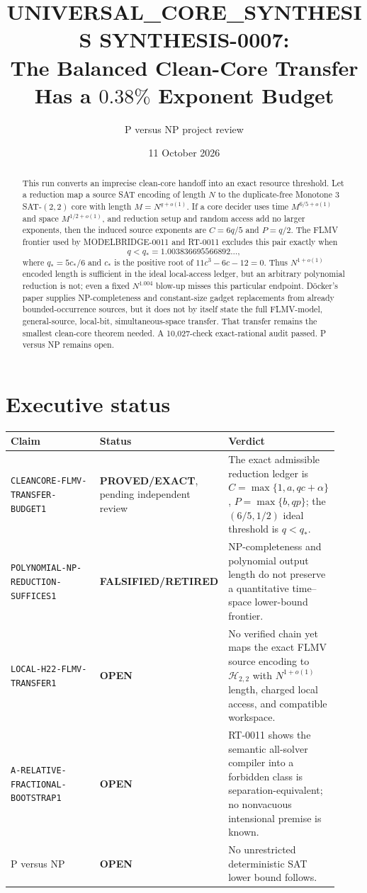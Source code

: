 \documentclass[11pt]{article}
\title{UNIVERSAL\_CORE\_SYNTHESIS SYNTHESIS-0007:\\
The Balanced Clean-Core Transfer Has a $0.38\%$ Exponent Budget}
\author{P versus NP project review}
\date{11 October 2026}
\newcommand{\Htwo}{\mathcal H_{2,2}}
\newcommand{\EXACT}{\textbf{PROVED/EXACT}}
\newcommand{\OPEN}{\textbf{OPEN}}
\newcommand{\RETIRED}{\textbf{FALSIFIED/RETIRED}}
\begin{document}
\maketitle

\begin{abstract}
This run converts an imprecise clean-core handoff into an exact resource
threshold.  Let a reduction map a source SAT encoding of length $N$ to the
duplicate-free Monotone $3$SAT-$(2,2)$ core with length
$M=N^{q+o(1)}$.  If a core decider uses time $M^{6/5+o(1)}$ and space
$M^{1/2+o(1)}$, and reduction setup and random access add no larger
exponents, then the induced source exponents are $C=6q/5$ and $P=q/2$.
The FLMV frontier used by MODELBRIDGE-0011 and RT-0011 excludes this pair
exactly when
\[
 q<q_* = 1.003836695566892\ldots,
\]
where $q_*=5c_*/6$ and $c_*$ is the positive root of
$11c^3-6c-12=0$.  Thus $N^{1+o(1)}$ encoded length is sufficient in the
ideal local-access ledger, but an arbitrary polynomial reduction is not;
even a fixed $N^{1.004}$ blow-up misses this particular endpoint.  D\"ocker's
paper supplies NP-completeness and constant-size gadget replacements from
already bounded-occurrence sources, but it does not by itself state the
full FLMV-model, general-source, local-bit, simultaneous-space transfer.
That transfer remains the smallest clean-core theorem needed.  A
10,027-check exact-rational audit passed.  P versus NP remains open.
\end{abstract}

\section{Executive status}
\begin{center}\small
\begin{tabular}{p{0.38\linewidth}p{0.20\linewidth}p{0.34\linewidth}}
\toprule Claim & Status & Verdict\\ \midrule
\texttt{CLEANCORE-FLMV-TRANSFER-BUDGET1} & \EXACT, pending independent review &
The exact admissible reduction ledger is $C=\max\{1,a,qc+\alpha\}$,
$P=\max\{b,qp\}$; the $(6/5,1/2)$ ideal threshold is $q<q_*$.\\
\texttt{POLYNOMIAL-NP-REDUCTION-SUFFICES1} & \RETIRED &
NP-completeness and polynomial output length do not preserve a quantitative
time--space lower-bound frontier.\\
\texttt{LOCAL-H22-FLMV-TRANSFER1} & \OPEN &
No verified chain yet maps the exact FLMV source encoding to $\Htwo$ with
$N^{1+o(1)}$ length, charged local access, and compatible workspace.\\
\texttt{A-RELATIVE-FRACTIONAL-BOOTSTRAP1} & \OPEN &
RT-0011 shows the semantic all-solver compiler into a forbidden class is
separation-equivalent; no nonvacuous intensional premise is known.\\
P versus NP & \OPEN & No unrestricted deterministic SAT lower bound follows.\\
\bottomrule
\end{tabular}
\end{center}
\end{document}
